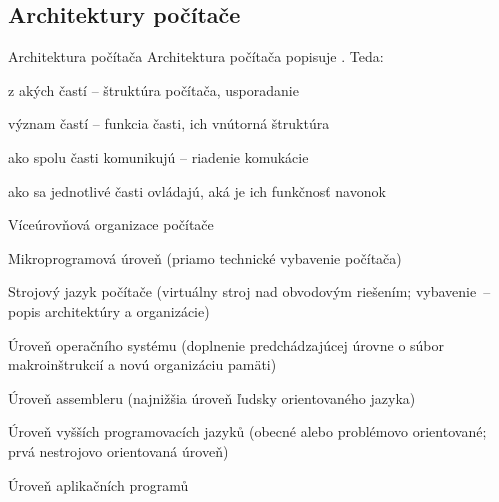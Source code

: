 \subsection{Architektury počítače}

\begin{definiceN}{Architektura počítača}
Architektura počítača popisuje . Teda:
\begin{pitemize}
	\item z akých častí -- štruktúra počítača, usporadanie
	\item význam častí -- funkcia časti, ich vnútorná štruktúra
	\item ako spolu časti komunikujú -- riadenie komukácie
	\item ako sa jednotlivé časti ovládajú, aká je ich funkčnosť navonok
\end{pitemize}
\end{definiceN}

\begin{definiceN}{Víceúrovňová organizace počítače}
\begin{pitemize}
	\item Mikroprogramová úroveň (priamo technické vybavenie počítača)
	\item Strojový jazyk počítače (virtuálny stroj nad obvodovým riešením; vybavenie~-- popis architektúry a organizácie)
	\item Úroveň operačního systému (doplnenie predchádzajúcej úrovne o súbor makroinštrukcií a novú organizáciu pamäti)
	\item Úroveň assembleru (najnižšia úroveň ľudsky orientovaného jazyka)
	\item Úroveň vyšších programovacích jazyků (obecné alebo problémovo orientované; prvá nestrojovo orientovaná úroveň)
	\item Úroveň aplikačních programů
\end{pitemize}
\end{definiceN}


